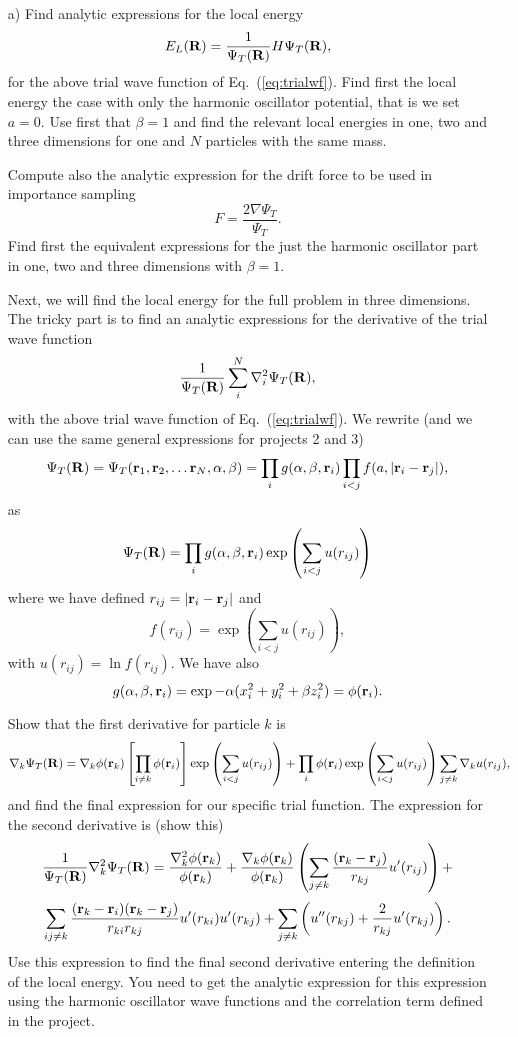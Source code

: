 \documentclass[10pt]{article}
\begin{document}
 \begin{enumerate}
 \item[a)] Find analytic expressions for the local energy 
 \begin{equation}
    E_L({\bf R})=\frac{1}{\Psi_T({\bf R})}H\Psi_T({\bf R}),
    \label{eq:locale}
 \end{equation}
 for the above 
 trial wave function of Eq.~(\ref{eq:trialwf}). 
Find first the local energy the case with only the harmonic oscillator potential, that is we set $a=0$.
Use first that $\beta =1$ and find the relevant local energies in one, two and three dimensions for one and
$N$ particles with the same mass. 

 Compute also the analytic expression for the drift force to be used in importance sampling
 \begin{equation}
   F = \frac{2\nabla \Psi_T}{\Psi_T}.
 \end{equation}
Find first the equivalent expressions for the just the harmonic oscillator part in one, two and three dimensions
with $\beta=1$. 

Next, we will find the local energy for the full problem in three dimensions.
The tricky part is to find an analytic expressions for the derivative of the trial wave function 
\[
   \frac{1}{\Psi_T({\bf R})}\sum_i^{N}\nabla_i^2\Psi_T({\bf R}),
\]
with the above 
trial wave function of Eq.~(\ref{eq:trialwf}).
We rewrite (and we can use the same general expressions for projects 2 and 3)
\[
\Psi_T({\bf R})=\Psi_T({\bf r}_1, {\bf r}_2, \dots {\bf r}_N,\alpha,\beta)=\prod_i g(\alpha,\beta,{\bf r}_i)\prod_{i<j}f(a,|{\bf r}_i-{\bf r}_j|),
\]
as
\[
\Psi_T({\bf R})=\prod_i g(\alpha,\beta,{\bf r}_i)\exp{\left(\sum_{i<j}u(r_{ij})\right)}
\]
where we have defined $r_{ij}=|{\bf r}_i-{\bf r}_j|$
and 
\[
   f(r_{ij})= \exp{\left(\sum_{i<j}u(r_{ij})\right)},
\]
with $u(r_{ij})=\ln{f(r_{ij})}$.
We have also
\[
    g(\alpha,\beta,{\bf r}_i) = \exp{-\alpha(x_i^2+y_i^2+\beta z_i^2)}= \phi({\bf r}_i).
\]

Show that the first  derivative for particle $k$ is
\[
  \nabla_k\Psi_T({\bf R}) = \nabla_k\phi({\bf r}_k)\left[\prod_{i\ne k}\phi({\bf r}_i)\right]\exp{\left(\sum_{i<j}u(r_{ij})\right)}+ 
\prod_i\phi({\bf r}_i)\exp{\left(\sum_{i<j}u(r_{ij})\right)}\sum_{j\ne k}\nabla_k u(r_{ij}),
\]
and find the final expression for our specific trial function.
The expression for the second derivative is (show this)
\[
   \frac{1}{\Psi_T({\bf R})}\nabla_k^2\Psi_T({\bf R})=
   \frac{\nabla_k^2\phi({\bf r}_k)}{\phi({\bf r}_k)}+
\frac{\nabla_k\phi({\bf r}_k)}{\phi({\bf r}_k)}\left(\sum_{j\ne k}\frac{({\bf r}_k-{\bf r}_j)}{r_{kj}}u'(r_{ij})\right)+
\] 
\[
\sum_{ij\ne k}\frac{({\bf r}_k-{\bf r}_i)({\bf r}_k-{\bf r}_j)}{r_{ki}r_{kj}}u'(r_{ki})u'(r_{kj})+
\sum_{j\ne k}\left( u''(r_{kj})+\frac{2}{r_{kj}}u'(r_{kj})\right).
\]
Use this expression to find the final second derivative entering the definition of the local energy. 
You need to get the analytic expression for this expression using the harmonic oscillator wave functions
and the correlation term defined in the project.




\end{enumerate}
\end{document}
